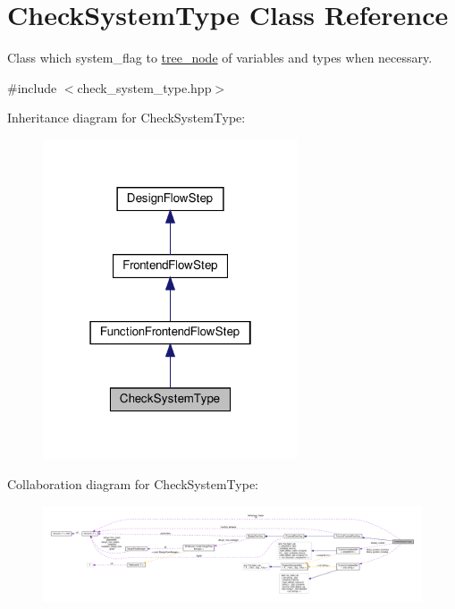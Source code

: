 \hypertarget{classCheckSystemType}{}\section{Check\+System\+Type Class Reference}
\label{classCheckSystemType}


Class which system\+\_\+flag to \hyperlink{classtree__node}{tree\+\_\+node} of variables and types when necessary.  




{\ttfamily \#include $<$check\+\_\+system\+\_\+type.\+hpp$>$}



Inheritance diagram for Check\+System\+Type\+:
\nopagebreak
\begin{figure}[H]
\begin{center}
\leavevmode
\includegraphics[width=214pt]{dc/d8a/classCheckSystemType__inherit__graph}
\end{center}
\end{figure}


Collaboration diagram for Check\+System\+Type\+:
\nopagebreak
\begin{figure}[H]
\begin{center}
\leavevmode
\includegraphics[width=350pt]{d5/d97/classCheckSystemType__coll__graph}
\end{center}
\end{figure}
